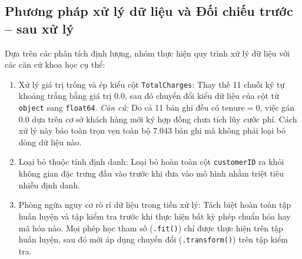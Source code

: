 \documentclass[a4paper]{article}
\begin{document}
{\subsection{Phương pháp xử lý dữ liệu và Đối chiếu trước -- sau xử lý}
Dựa trên các phân tích định lượng, nhóm thực hiện quy trình xử lý dữ liệu với các căn cứ khoa học cụ thể:
\begin{enumerate}[nosep, topsep=1pt, itemsep=1pt]
    \item Xử lý giá trị trống và ép kiểu cột \texttt{TotalCharges}: Thay thế 11 chuỗi ký tự khoảng trắng bằng giá trị 0.0, sau đó chuyển đổi kiểu dữ liệu của cột từ \texttt{object} sang \texttt{float64}. \textit{Căn cứ:} Do cả 11 bản ghi đều có $\text{tenure} = 0$, việc gán 0.0 dựa trên cơ sở khách hàng mới ký hợp đồng chưa tích lũy cước phí. Cách xử lý này bảo toàn trọn vẹn toàn bộ 7.043 bản ghi mà không phải loại bỏ dòng dữ liệu nào.
    \item Loại bỏ thuộc tính định danh: Loại bỏ hoàn toàn cột \texttt{customerID} ra khỏi không gian đặc trưng đầu vào trước khi đưa vào mô hình nhằm triệt tiêu nhiễu định danh.
    \item Phòng ngừa nguy cơ rò rỉ dữ liệu trong tiền xử lý: Tách biệt hoàn toàn tập huấn luyện và tập kiểm tra trước khi thực hiện bất kỳ phép chuẩn hóa hay mã hóa nào. Mọi phép học tham số (\texttt{.fit()}) chỉ được thực hiện trên tập huấn luyện, sau đó mới áp dụng chuyển đổi (\texttt{.transform()}) trên tập kiểm tra.
\end{enumerate}

}
\end{document}
